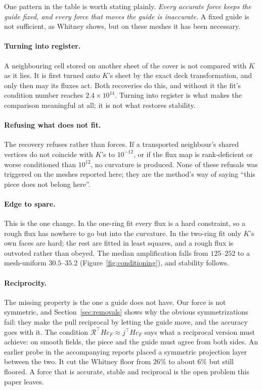 \documentclass[11pt]{article}
\theoremstyle{definition}
\theoremstyle{remark}
\newcommand{\cR}{\mathcal{R}}
\begin{document}
One pattern in the table is worth stating plainly. \emph{Every accurate force keeps the
guide fixed, and every force that moves the guide is inaccurate.} A fixed guide is not
sufficient, as Whitney shows, but on these meshes it has been necessary.

\paragraph{Turning into register.} A neighbouring cell stored on another sheet of the
cover is not compared with $K$ as it lies. It is first turned onto $K$'s sheet by the
exact deck transformation, and only then may its fluxes act. Both recoveries do this,
and without it the fit's condition number reaches $2.4\times10^{14}$. Turning into
register is what makes the comparison meaningful at all; it is not what restores
stability.

\paragraph{Refusing what does not fit.} The recovery refuses rather than forces. If a
transported neighbour's shared vertices do not coincide with $K$'s to $10^{-12}$, or if
the flux map is rank-deficient or worse conditioned than $10^{12}$, no curvature is
produced. None of these refusals was triggered on the meshes reported here; they are the
method's way of saying ``this piece does not belong here''.

\paragraph{Edge to spare.} This is the one change. In the one-ring fit every flux is a
hard constraint, so a rough flux has nowhere to go but into the curvature. In the
two-ring fit only $K$'s own faces are hard; the rest are fitted in least squares, and a
rough flux is outvoted rather than obeyed. The median amplification falls from $125$--$252$
to a mesh-uniform $30.5$--$35.2$ (Figure~\ref{fig:conditioning}), and stability follows.

\paragraph{Reciprocity.} The missing property is the one a guide does not have. Our
force is not symmetric, and Section~\ref{sec:removals} shows why the obvious
symmetrizations fail: they make the pull reciprocal by letting the guide move, and the
accuracy goes with it. The condition $\cR^\top Hc_F\approx j^\top Hc_F$ says what a
reciprocal version must achieve: on smooth fields, the piece and the guide must agree
from both sides. An earlier probe in the accompanying reports placed a symmetric
projection layer between the two. It cut the Whitney floor from $26\%$ to about $6\%$
but still floored. A force that is accurate, stable and reciprocal is the open problem
this paper leaves.
\end{document}
